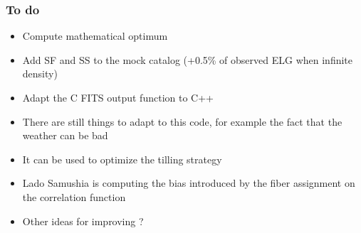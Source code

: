 \documentclass{beamer}
\begin{document}
\begin{frame}\frametitle{To do}
	\begin{itemize}
		\item Compute mathematical optimum
		\item Add SF and SS to the mock catalog (+0.5\% of observed ELG when infinite density)
		\item Adapt the C FITS output function to C++
		\item There are still things to adapt to this code, for example the fact that the weather can be bad
		\item It can be used to optimize the tilling strategy
		\item Lado Samushia is computing the bias introduced by the fiber assignment on the correlation function
		\item Other ideas for improving ?
	\end{itemize}
\end{frame}




\end{document}
